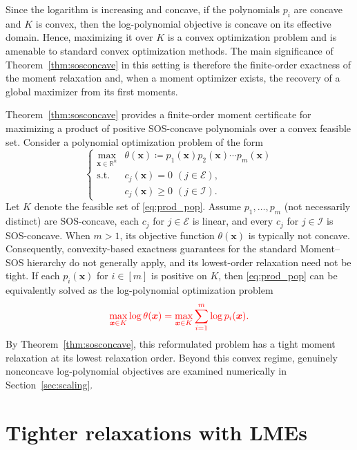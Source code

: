 \documentclass[pdflatex,sn-mathphys-num]{sn-jnl}%
\newcommand{\re}{\mathbb{R}}
\newcommand{\rd}[1]{{\color{red}#1}}
\newcommand{\vect}[1]{\boldsymbol{#1}}
\newcommand{\st}{\mathrm{s.t.}}
\newcommand{\ddd}{,\ldots,}
\theoremstyle{thmstyleone}%
\theoremstyle{thmstyletwo}%
\theoremstyle{thmstylethree}%
\begin{document}
\rd{Since the logarithm is increasing and concave, if the polynomials
$p_i$ are concave and $K$ is convex, then the log-polynomial
objective is concave on its effective domain. Hence, maximizing it
over $K$ is a convex optimization problem and is amenable to
standard convex optimization methods. The main significance of
Theorem~\ref{thm:sosconcave} in this setting is therefore the
finite-order exactness of the moment relaxation and, when a moment
optimizer exists, the recovery of a global maximizer from its first
moments.}

\rd{Theorem~\ref{thm:sosconcave} provides a finite-order moment
certificate for maximizing a product of positive SOS-concave
polynomials over a convex feasible set.}
Consider a polynomial optimization problem of the form
\begin{equation}\label{eq:prod_pop}
	\left\{\begin{array}{cll}
		\max\limits_{\vect{x}\in\re^n} & \theta(\vect{x})\coloneqq p_1(\vect{x})p_2(\vect{x})\cdots p_{m}(\vect{x})\\
		\st & c_j(\vect{x}) = 0 \,\, (j \in \mathcal{E}),\\
		& c_j(\vect{x}) \geq 0 \,\, (j \in \mathcal{I}).
	\end{array}\right.
\end{equation}
Let $K$ denote the feasible set of \eqref{eq:prod_pop}.
Assume $p_1\ddd p_m$ (not necessarily distinct) are SOS-concave,
each $c_{j}$ for $j\in\mathcal{E}$ is linear, and every $c_{j}$ for $j\in\mathcal{I}$ is SOS-concave.
When $m > 1$, its objective function $\theta(\vect{x})$ is typically not concave.
\rd{Consequently, convexity-based exactness guarantees for the standard
Moment--SOS hierarchy do not generally apply, and its lowest-order
relaxation need not be tight.}
If each $p_i(\vect{x})$ for $i\in[m]$ is positive on $K$, then \eqref{eq:prod_pop} can 
be equivalently solved as the log-polynomial optimization problem
\[
\rd{\max\limits_{\vect{x}\in K}\log \theta(\vect{x})
=\max\limits_{\vect{x}\in K}\sum\limits_{i=1}^m\log p_i(\vect{x}).}
\]
By Theorem~\ref{thm:sosconcave}, this reformulated problem has 
a tight moment relaxation at its lowest relaxation order.
\rd{Beyond this convex regime, genuinely nonconcave log-polynomial
objectives are examined numerically in Section~\ref{sec:scaling}.}




\section{Tighter relaxations with LMEs}
\label{sec:LME}
\end{document}
